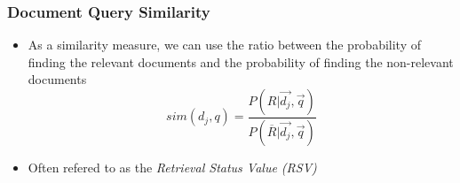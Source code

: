 \documentclass[svgnames]{beamer}
\begin{document}

\begin{frame} \frametitle{Document Query Similarity}

  \begin{block}{}
    \begin{itemize}
    \item As a similarity measure, we can use the ratio between the probability of
      finding the relevant documents and the probability of finding the
      non-relevant documents
      \begin{displaymath}
          sim(d_j,q) = \frac{P(R|\vec{d_j},\vec{q})}{P(\overline{R}|\vec{d_j},\vec{q})}
      \end{displaymath}
     \item Often refered to as the \emph{Retrieval Status Value (RSV)}
    \end{itemize}
  \end{block}
\end{frame}

\end{document}

